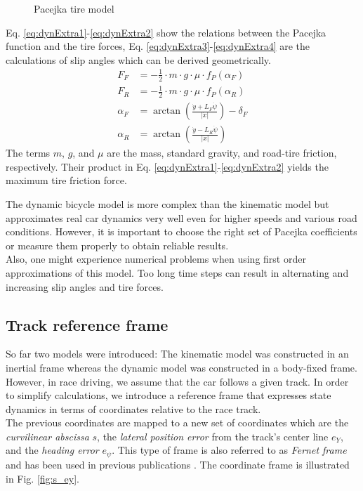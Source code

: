 \begin{figure}[ht]
	\centering
  	
	\caption{Pacejka tire model}
	\label{fig:Pacejka}
\end{figure}
Eq. \eqref{eq:dynExtra1}-\eqref{eq:dynExtra2} show the relations between the Pacejka function and the tire forces, Eq. \eqref{eq:dynExtra3}-\eqref{eq:dynExtra4} are the calculations of slip angles which can be derived geometrically.
\begin{subequations}\label{eq:dynExtra}
\begin{align}
    F_F &= -\frac{1}{2}\cdot m\cdot g\cdot \mu \cdot f_P(\alpha_F)\label{eq:dynExtra1}\\
    F_R &= -\frac{1}{2}\cdot m\cdot g\cdot \mu \cdot f_P(\alpha_R)\label{eq:dynExtra2}\\
    \alpha_F &= \arctan\left(\frac{\dot y+L_F\dot\psi}{\lvert\dot x\lvert}\right) - \delta_F\label{eq:dynExtra3}\\
    \alpha_R &= \arctan\left(\frac{\dot y-L_R\dot\psi}{\lvert\dot x\rvert}\right)\label{eq:dynExtra4}
\end{align}
\end{subequations}
The terms $m$, $g$, and $\mu$ are the mass, standard gravity, and road-tire friction, respectively. Their product in Eq. \eqref{eq:dynExtra1}-\eqref{eq:dynExtra2} yields the maximum tire friction force.

The dynamic bicycle model is more complex than the kinematic model but approximates real car dynamics very well even for higher speeds and various road conditions. However, it is important to choose the right set of Pacejka coefficients or measure them properly to obtain reliable results.\\
Also, one might experience numerical problems when using first order approximations of this model. Too long time steps can result in alternating and increasing slip angles and tire forces.

\subsection{Track reference frame}
So far two models were introduced: The kinematic model was constructed in an inertial frame whereas the dynamic model was constructed in a body-fixed frame. However, in race driving, we assume that the car follows a given track. In order to simplify calculations, we introduce a reference frame that expresses state dynamics in terms of coordinates relative to the race track.\\
The previous coordinates are mapped to a new set of coordinates which are the \emph{curvilinear abscissa} $s$, the \emph{lateral position error} from the track's center line $e_Y$, and the \emph{heading error} $e_\psi$. This type of frame is also referred to as \emph{Fernet frame} and has been used in previous publications \cite{Micaelli2006}. The coordinate frame is illustrated in Fig. \ref{fig:s_ey}.


